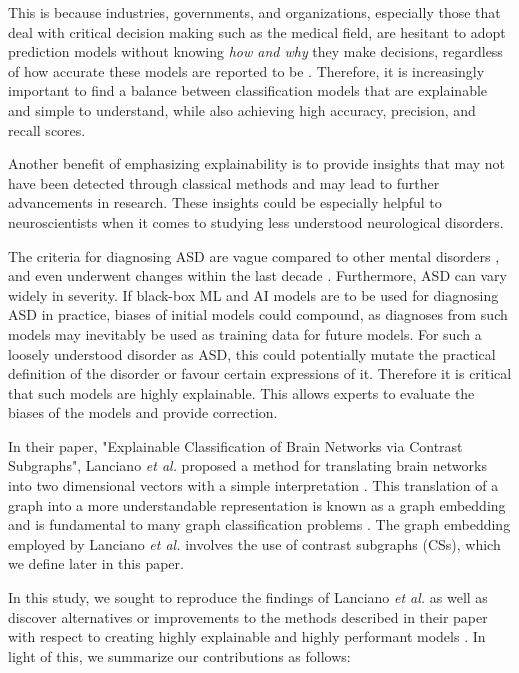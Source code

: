 \documentclass[letterpaper]{article}
\begin{document}
This is because industries, governments, and organizations, especially those that deal with critical decision making such as the medical field, are hesitant to adopt prediction models without knowing \emph{how and why} they make decisions, regardless of how accurate these models are reported to be \cite{asan2020}.
Therefore, it is increasingly important to find a balance between classification models that are explainable and simple to understand, while also achieving high accuracy, precision, and recall scores.

Another benefit of emphasizing explainability is to provide insights that may not have been detected through classical methods and may lead to further advancements in research.
These insights could be especially helpful to neuroscientists when it comes to studying less understood neurological disorders.

The criteria for diagnosing ASD are vague compared to other mental disorders \cite{dsm52013}, and even underwent changes within the last decade \cite{grant2013}.
Furthermore, ASD can vary widely in severity.
If black-box ML and AI models are to be used for diagnosing ASD in practice, biases of initial models could compound, as diagnoses from such models may inevitably be used as training data for future models.
For such a loosely understood disorder as ASD, this could potentially mutate the practical definition of the disorder or favour certain expressions of it.
Therefore it is critical that such models are highly explainable.
This allows experts to evaluate the biases of the models and provide correction.

In their paper, "Explainable Classification of Brain Networks via Contrast Subgraphs", Lanciano \emph{et al.} proposed a method for translating brain networks into two dimensional vectors with a simple interpretation \cite{lanciano2020}.
This translation of a graph into a more understandable representation is known as a graph embedding and is fundamental to many graph classification problems \cite{goyal2018}.
The graph embedding employed by Lanciano \emph{et al.} involves the use of contrast subgraphs (CSs), which we define later in this paper.

In this study, we sought to reproduce the findings of Lanciano \emph{et al.} as well as discover alternatives or improvements to the methods described in their paper with respect to creating highly explainable and highly performant models \cite{lanciano2020}.
In light of this, we summarize our contributions as follows:
\end{document}
